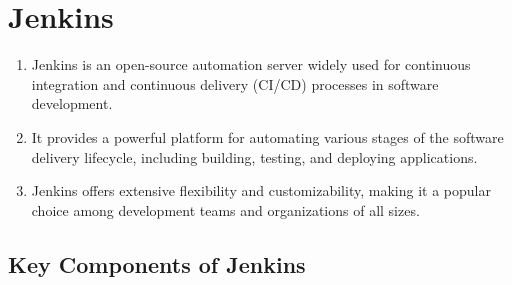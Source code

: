 \newpage

\section*{Jenkins}


\begin{enumerate}
    \item Jenkins is an open-source automation server widely used for continuous integration and continuous delivery (CI/CD) processes in software development.
    
    \item It provides a powerful platform for automating various stages of the software delivery lifecycle, including building, testing, and deploying applications.
    
    \item Jenkins offers extensive flexibility and customizability, making it a popular choice among development teams and organizations of all sizes.
\end{enumerate}

\subsection*{Key Components of Jenkins}

